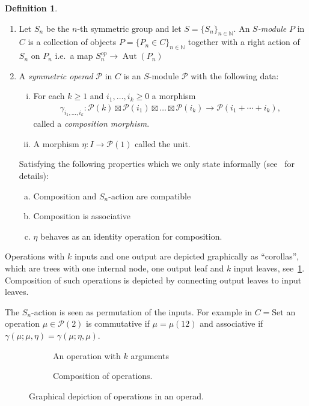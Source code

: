 \documentclass{scrartcl}
\theoremstyle{plain}
\theoremstyle{definition}
\newtheorem{definition}[theorem]{Definition}
\newcommand{\N}{\mathbb{N}}
\DeclareMathOperator{\Aut}{Aut}
\begin{document}
\begin{definition}
    \begin{enumerate}[(1)]
    \item Let $S_n$ be the $n$-th symmetric group and let $S = {\{S_n\}}_{n\in \N}$. An \emph{$S$-module} $P$ in $C$ is a collection of objects $P = \{P_n\in {C}\}_{n\in \N}$ together with a right action of $S_n$ on $P_n$ i.e.\ a map $S_n^{op} \to \Aut(P_n)$
    \item A \emph{symmetric operad} $\mathcal P$ in $C$ is an $S$-module $\mathcal P$ with the following data:
    \begin{enumerate}[(i)]
        \item For each $k\geq 1$ and $i_1, \dots, i_k \geq 0$ a morphism 
        \begin{align*} 
            \gamma_{i_1, \dots, i_k} \colon \mathcal P(k) \boxtimes \mathcal P(i_1) \boxtimes \dots \boxtimes \mathcal P(i_k) \to \mathcal P(i_1 + \cdots + i_k),
        \end{align*} called a \emph{composition morphism}.
        \item A morphism $\eta \colon I \to \mathcal P(1)$ called the unit.
    \end{enumerate}
    Satisfying the following properties which we only state informally (see~\cite[Def. 1.7]{Maz} for details):
    \begin{enumerate}[(a)]
        \item Composition and $S_n$-action are compatible
        \item Composition is associative
        \item $\eta$ behaves as an identity operation for composition. 
    \end{enumerate}
\end{enumerate}
\end{definition}

Operations with $k$ inputs and one output are depicted graphically as ``corollas'', which are trees with one internal node, one output leaf and $k$ input leaves, see~\ref{operad_corolla}. Composition of such operations is depicted by connecting output leaves to input leaves. 

The $S_n$-action is seen as permutation of the inputs. For example in $C=\mathrm{Set}$ an operation $\mu\in \mathcal P(2)$ is commutative if $\mu = \mu (12)$ and associative if $\gamma(\mu; \mu, \eta) = \gamma(\mu; \eta, \mu)$.

\begin{figure}[ht]
\centering
\begin{subfigure}[b]{0.25\textwidth}
    \centering
    
    \caption{An operation with $k$ arguments}
\end{subfigure}
\hfill
\begin{subfigure}[b]{0.7\textwidth}
    \centering
    
    \caption{Composition of operations. }
\end{subfigure}
\caption{Graphical depiction of operations in an operad. }\label{operad_corolla}
\end{figure}
\end{document}

